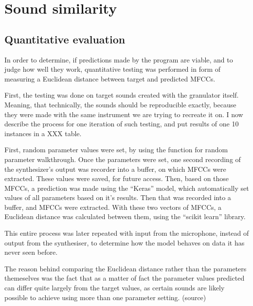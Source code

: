 \section{Sound similarity}

\subsection{Quantitative evaluation}

In order to determine, if predictions made by the program are viable,
and to judge how well they work, quantitative testing was performed in
form of measuring a Euclidean distance between target and predicted
MFCCs.

First, the testing was done on target sounds created with the
granulator itself. Meaning, that technically, the sounds should be
reproducible exactly, because they were made with the same instrument
we are trying to recreate it on. I now describe the process for one
iteration of such testing, and put results of one 10 instances in a
XXX table.

First, random parameter values were set, by using the function for
random parameter walkthrough. Once the parameters were set, one second
recording of the synthesizer's output was recorder into a buffer, on
which MFCCs were extracted. These values were saved, for future
access. Then, based on those MFCCs, a prediction was made using the
``Keras'' model, which automatically set values of all parameters
based on it's results. Then that was recorded into a buffer, and MFCCs
were extracted. With these two vectors of MFCCs, a Euclidean distance
was calculated between them, using the ``scikit learn'' library.


This entire process was later repeated with input from the microphone,
instead of output from the synthesiser, to determine how the model
behaves on data it has never seen before.

The reason behind comparing the Euclidean distance rather than the
parameters themeselves was the fact that as a matter of fact the
parameter values predicted can differ quite largely from the target
values, as certain sounds are likely possible to achieve using more
than one parameter setting. (source)



